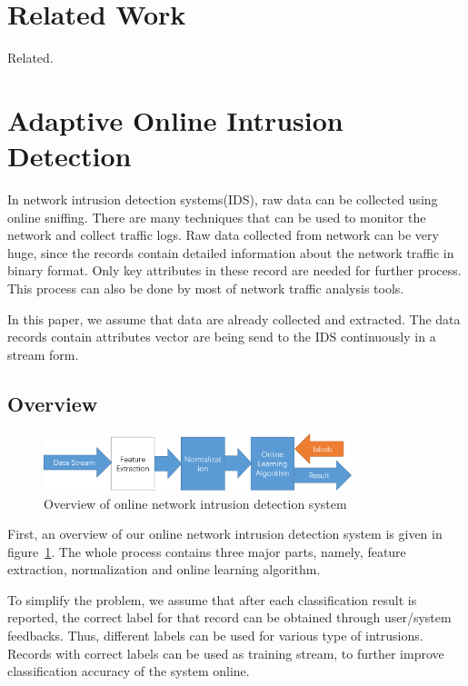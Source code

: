 \documentclass[runningheads]{llncs}
\begin{document}
	\section{Related Work} \label{related work}
	
	Related.
	
	\section{Adaptive Online Intrusion Detection} \label{Our Method}
	
	In network intrusion detection systems(IDS), raw data can be collected using online sniffing. There are many techniques that can be used to monitor the network and collect traffic logs.
	Raw data collected from network can be very huge, since the records contain detailed information about the network traffic in binary format. Only key attributes in these record are needed for further process. This process can also be done by most of network traffic analysis tools. 
	
	In this paper, we assume that data are already collected and extracted. The data records contain attributes vector are being send to the IDS continuously in a stream form. 
	 
	
	\subsection{Overview}
	
	\begin{figure}
		\centering
		\includegraphics[width=0.8\textwidth]{overview}
		\caption{Overview of online network intrusion detection system}
		\label{fig:overview}
	\end{figure}
	
	First, an overview of our online network intrusion detection system is given in figure~\ref{fig:overview}. The whole process contains three major parts, namely, feature extraction, normalization and online learning algorithm.
	
	To simplify the problem, we assume that after each classification result is reported, the correct label for that record can be obtained through user/system feedbacks. Thus, different labels can be used for various type of intrusions. Records with correct labels can be used as training stream, to further improve classification accuracy of the system online.
	
\end{document}
